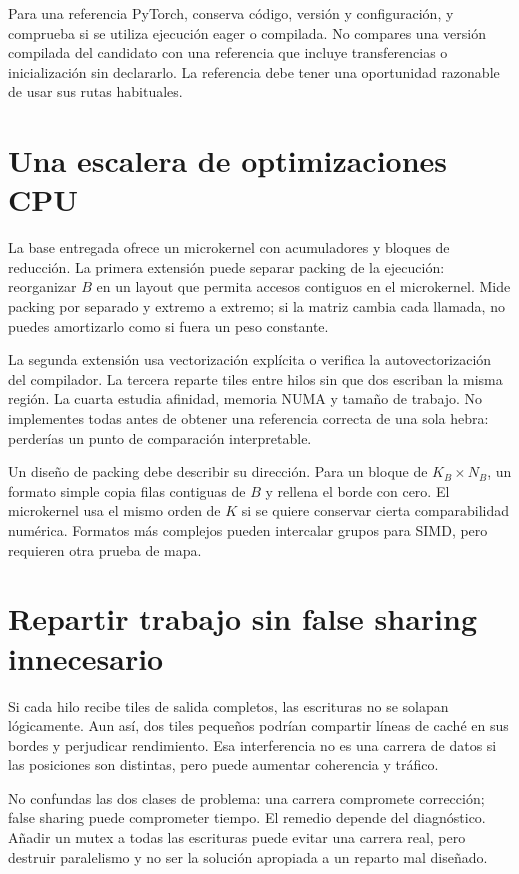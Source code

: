 \documentclass[12pt,a4paper,oneside]{report}
\begin{document}
Para una referencia PyTorch, conserva código, versión y configuración, y comprueba si se utiliza ejecución eager o compilada. No compares una versión compilada del candidato con una referencia que incluye transferencias o inicialización sin declararlo. La referencia debe tener una oportunidad razonable de usar sus rutas habituales.

\section{Una escalera de optimizaciones CPU}
La base entregada ofrece un microkernel con acumuladores y bloques de reducción. La primera extensión puede separar packing de la ejecución: reorganizar $B$ en un layout que permita accesos contiguos en el microkernel. Mide packing por separado y extremo a extremo; si la matriz cambia cada llamada, no puedes amortizarlo como si fuera un peso constante.

La segunda extensión usa vectorización explícita o verifica la autovectorización del compilador. La tercera reparte tiles entre hilos sin que dos escriban la misma región. La cuarta estudia afinidad, memoria NUMA y tamaño de trabajo. No implementes todas antes de obtener una referencia correcta de una sola hebra: perderías un punto de comparación interpretable.

Un diseño de packing debe describir su dirección. Para un bloque de $K_B\times N_B$, un formato simple copia filas contiguas de $B$ y rellena el borde con cero. El microkernel usa el mismo orden de $K$ si se quiere conservar cierta comparabilidad numérica. Formatos más complejos pueden intercalar grupos para SIMD, pero requieren otra prueba de mapa.

\section{Repartir trabajo sin false sharing innecesario}
Si cada hilo recibe tiles de salida completos, las escrituras no se solapan lógicamente. Aun así, dos tiles pequeños podrían compartir líneas de caché en sus bordes y perjudicar rendimiento. Esa interferencia no es una carrera de datos si las posiciones son distintas, pero puede aumentar coherencia y tráfico.

No confundas las dos clases de problema: una carrera compromete corrección; false sharing puede comprometer tiempo. El remedio depende del diagnóstico. Añadir un mutex a todas las escrituras puede evitar una carrera real, pero destruir paralelismo y no ser la solución apropiada a un reparto mal diseñado.
\end{document}
